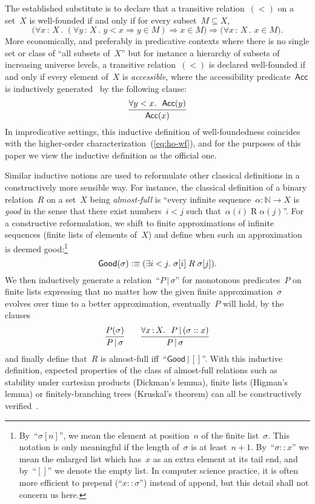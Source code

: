 \documentclass[oneside,reqno]{amsart}
\theoremstyle{definition}
\theoremstyle{plain}
\theoremstyle{remark}
\newcommand{\NN}{\mathbb{N}}
\newcommand{\defeqv}{\vcentcolon\equiv}
\renewcommand{\_}{\mathpunct{.}\,}
\newcommand{\?}{\,{:}\,}
\begin{document}
The established substitute is to declare that a transitive relation~$({<})$ on a set~$X$
is well-founded if and only if for every subset~$M \subseteq X$,
\begin{equation}\label{eq:ho-wf}\tag{$\star$}
\bigl(\forall x\?X\_ (\forall y\?X\_ y < x \Rightarrow y \in M) \Rightarrow x \in
M\bigr) \Longrightarrow \bigl(\forall x\?X\_ x \in M\bigr).
\end{equation}
More economically, and preferably in predicative contexts where there is no
single set or class of ``all subsets of~$X$'' but for instance a
hierarchy of subsets of increasing universe levels, a transitive relation~$({<})$ is
declared well-founded if and only if every element of~$X$ is \emph{accessible}, where
the accessibility predicate~$\mathsf{Acc}$ is inductively generated~\cite{xxx}
by the following clause:
\[
  \infer{\mathsf{Acc}(x)}{\forall y<x\_\ \mathsf{Acc}(y)}
\]
In impredicative settings, this inductive definition of well-foundedness
coincides with the higher-order characterization~(\ref{eq:ho-wf}), and for the
purposes of this paper we view the inductive definition as the official one.

Similar inductive notions are used to reformulate other classical definitions
in a constructively more sensible way. For instance, the classical definition
of a binary relation~$R$ on a set~$X$ being \emph{almost-full} is ``every
infinite sequence~$\alpha : \NN \to X$ is \emph{good} in the sense that there
exist numbers~$i < j$ such that~$\alpha(i) \mathrel{R} \alpha(j)$''.
For a constructive reformulation, we shift to finite approximations of
infinite sequences (finite lists of elements of~$X$) and define when such an
approximation is deemed good:\footnote{By~``$\sigma[n]$'', we mean the element
at position~$n$ of the finite list~$\sigma$. This notation is only meaningful
if the length of~$\sigma$ is at least~$n+1$. By~``$\sigma :: x$'' we mean the
enlarged list which has~$x$ as an extra element at its tail end, and by~``$[]$'' we
denote the empty list. In computer science practice, it is often more efficient
to prepend (``$x :: \sigma$'') instead of append, but this detail shall not
concern us here.}
\[ \mathsf{Good}(\sigma) \defeqv (\exists i<j\_ \sigma[i] \mathrel{R} \sigma[j]). \]
We then inductively generate a relation~``$P \,|\, \sigma$'' for monotonous
predicates~$P$ on finite lists expressing that no matter how the given finite
approximation~$\sigma$ evolves over time to a better approximation,
eventually~$P$ will hold, by the clauses
\[
  \infer{P \,|\, \sigma}{P(\sigma)}
  \qquad
  \infer{P \,|\, \sigma}{\forall x \? X\_\ P \,|\, (\sigma :: x)}
\]
and finally define that~$R$ is almost-full iff~``$\mathsf{Good} \,|\, []$''.
With this inductive definition, expected properties of the class of almost-full
relations such as stability under cartesian products (Dickman's lemma),
finite lists (Higman's lemma) or finitely-branching trees (Kruskal's theorem)
can all be constructively verified~\cite{xxx}.
\end{document}

